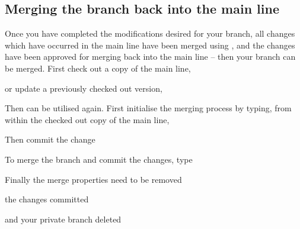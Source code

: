 \subsection{Merging the branch back into the main line}

Once you have completed the modifications desired for your branch, all changes which have occurred in the main line have been merged using , and the changes have been approved for merging back into the main line -- then your branch can be merged.
First check out a copy of the main line,


or update a previously checked out version,


Then  can be utilised again.
First initialise the merging process by typing, from within the checked out copy of the main line, 


Then commit the change


To merge the branch and commit the changes, type



Finally the merge properties need to be removed


the changes committed


and your private branch deleted





